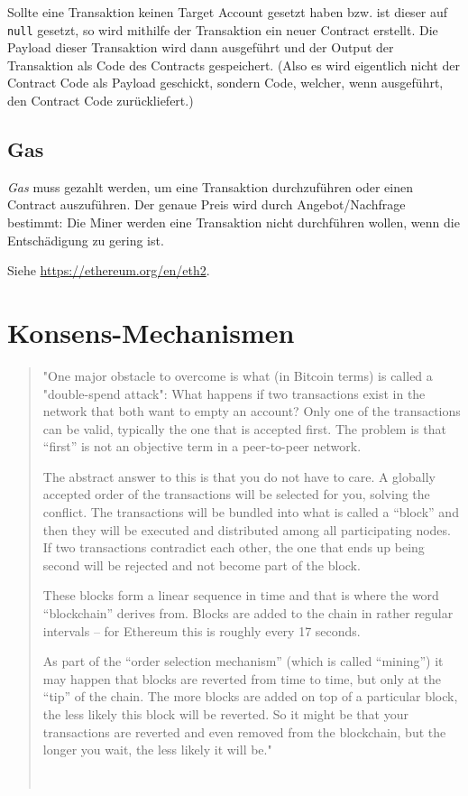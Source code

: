 Sollte eine Transaktion keinen Target Account gesetzt haben bzw. ist dieser auf \texttt{null} gesetzt, so wird mithilfe der Transaktion ein neuer Contract erstellt. Die Payload dieser Transaktion wird dann ausgeführt und der Output der Transaktion als Code des Contracts gespeichert. (Also es wird eigentlich nicht der Contract Code als Payload geschickt, sondern Code, welcher, wenn ausgeführt, den Contract Code zurückliefert.)

\subsection{Gas}
\textit{Gas} muss gezahlt werden, um eine Transaktion durchzuführen oder einen Contract auszuführen. Der genaue Preis wird durch Angebot/Nachfrage bestimmt: Die Miner werden eine Transaktion nicht durchführen wollen, wenn die Entschädigung zu gering ist.

Siehe \url{https://ethereum.org/en/eth2}.

\section{Konsens-Mechanismen}
\begin{quote}
\begin{itshape}
"One major obstacle to overcome is what (in Bitcoin terms) is called a "double-spend attack": What happens if two transactions exist in the network that both want to empty an account? Only one of the transactions can be valid, typically the one that is accepted first. The problem is that “first” is not an objective term in a peer-to-peer network.

The abstract answer to this is that you do not have to care. A globally accepted order of the transactions will be selected for you, solving the conflict. The transactions will be bundled into what is called a “block” and then they will be executed and distributed among all participating nodes. If two transactions contradict each other, the one that ends up being second will be rejected and not become part of the block.

These blocks form a linear sequence in time and that is where the word “blockchain” derives from. Blocks are added to the chain in rather regular intervals -- for Ethereum this is roughly every 17 seconds.

As part of the “order selection mechanism” (which is called “mining”) it may happen that blocks are reverted from time to time, but only at the “tip” of the chain. The more blocks are added on top of a particular block, the less likely this block will be reverted. So it might be that your transactions are reverted and even removed from the blockchain, but the longer you wait, the less likely it will be."
\end{itshape}
\ \cite[Solidity Docs, Blocks]{Blocks_Solidity}
\end{quote}

